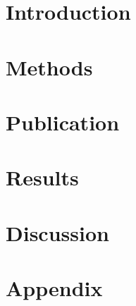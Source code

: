 \documentclass[11pt, titlepage, a4paper, twoside, onecolumn, DIV=calc]{scrbook} %
\begin{document}
\tableofcontents %


\listoffigures %


\listoftables %



\clearpage


\mainmatter %


\pagestyle{raphimen}




\part{Introduction}

 

 
 
 
 
 
% 
% 

\part{Methods}




\part{Publication}
\renewcommand{\cftdot}{}


\pagestyle{raphimen}

\part{Results}




\part{Discussion}
 

\part{Appendix}
\setcounter{chapter}{8}

\end{document}
